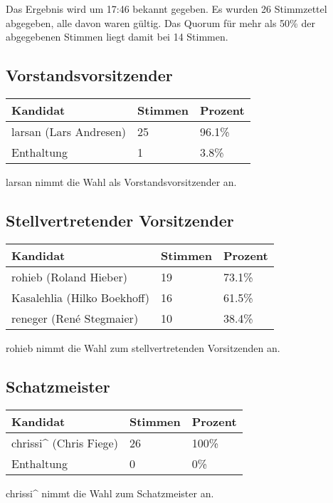 \documentclass[a4paper,12pt]{scrartcl}
\begin{document}
Das Ergebnis wird um 17:46 bekannt gegeben. Es wurden 26 Stimmzettel abgegeben,
alle davon waren gültig. Das Quorum für mehr als 50\% der abgegebenen Stimmen
liegt damit bei 14 Stimmen.

\subsection*{Vorstandsvorsitzender}
\begin{tabular}{|l|l|l|}
  \hline
  \textbf{Kandidat} & \textbf{Stimmen} & \textbf{Prozent} \\ \hline
  larsan (Lars Andresen) & 25 & 96.1\% \\
  Enthaltung             &  1 &  3.8\% \\
  \hline
\end{tabular}

larsan nimmt die Wahl als Vorstandsvorsitzender an.

\subsection*{Stellvertretender Vorsitzender}
\begin{tabular}{|l|l|l|}
  \hline
  \textbf{Kandidat} & \textbf{Stimmen} & \textbf{Prozent} \\ \hline
  rohieb     (Roland Hieber)  & 19 & 73.1\% \\
  Kasalehlia (Hilko Boekhoff) & 16 & 61.5\% \\
  reneger    (René Stegmaier) & 10 & 38.4\% \\
  \hline
\end{tabular}

rohieb nimmt die Wahl zum stellvertretenden Vorsitzenden an.

\subsection*{Schatzmeister}
\begin{tabular}{|l|l|l|}
  \hline
  \textbf{Kandidat} & \textbf{Stimmen} & \textbf{Prozent} \\ \hline
  chrissi\textasciicircum{} (Chris Fiege) & 26 & 100\% \\
  Enthaltung & 0 & 0\% \\
  \hline
\end{tabular}

chrissi\textasciicircum{} nimmt die Wahl zum Schatzmeister an.
\end{document}
